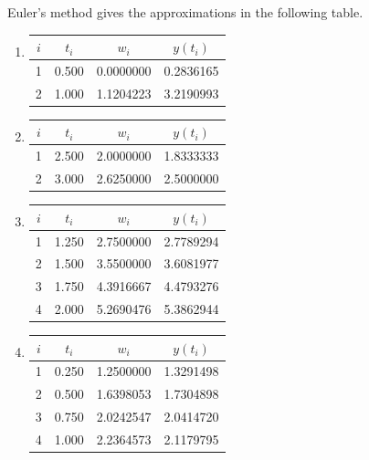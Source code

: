 \begin{myexercise}
\begin{mysolution}
Euler's method gives the approximations in the following table.
\begin{enumerate}[label=(\alph*)]
\item
\begin{center}
\begin{tabular}{cccc}
\hline
$i$ & $t_{i}$ & $w_{i}$ & $y\left(t_{i}\right)$ \\
\hline
1 & 0.500 & 0.0000000 & 0.2836165 \\
2 & 1.000 & 1.1204223 & 3.2190993 \\
\hline
\end{tabular}
\end{center}
\item
\begin{center}
\begin{tabular}{cccc}
\hline
$i$ & $t_{i}$ & $w_{i}$ & $y\left(t_{i}\right)$ \\
\hline
1 & 2.500 & 2.0000000 & 1.8333333 \\
2 & 3.000 & 2.6250000 & 2.5000000 \\
\hline
\end{tabular}
\end{center}
\item
\begin{center}
\begin{tabular}{cccc}
$i$ & $t_{i}$ & $w_{i}$ & $y\left(t_{i}\right)$ \\
\hline
1 & 1.250 & 2.7500000 & 2.7789294 \\
2 & 1.500 & 3.5500000 & 3.6081977 \\
3 & 1.750 & 4.3916667 & 4.4793276 \\
4 & 2.000 & 5.2690476 & 5.3862944 \\
\hline
\end{tabular}
\end{center}
\item
\begin{center}
\begin{tabular}{cccc}
\hline
$i$ & $t_{i}$ & $w_{i}$ & $y\left(t_{i}\right)$ \\
\hline
1 & 0.250 & 1.2500000 & 1.3291498 \\
2 & 0.500 & 1.6398053 & 1.7304898 \\
3 & 0.750 & 2.0242547 & 2.0414720 \\
4 & 1.000 & 2.2364573 & 2.1179795 \\
\hline
\end{tabular}
\end{center}
\end{enumerate}
\end{mysolution}
\end{myexercise}


